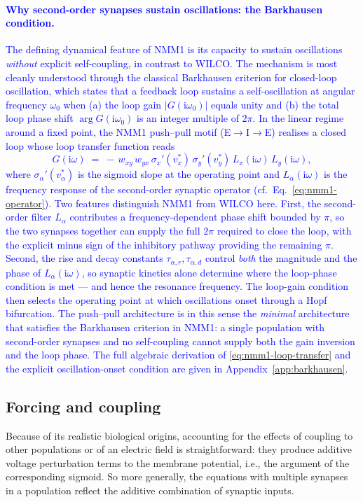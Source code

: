 \documentclass[12pt]{article}
\numberwithin{equation}{section}
\newcommand{\rev}[1]{\textcolor{blue}{#1}}
\begin{document}
\rev{\paragraph{Why second-order synapses sustain oscillations: the Barkhausen condition.}
The defining dynamical feature of NMM1 is its capacity to sustain oscillations \emph{without} explicit self-coupling, in contrast to WILCO. The mechanism is most cleanly understood through the classical Barkhausen criterion for closed-loop oscillation, which states that a feedback loop sustains a self-oscillation at angular frequency $\omega_0$ when (a) the loop gain $|G(\mathrm{i}\omega_0)|$ equals unity and (b) the total loop phase shift $\arg G(\mathrm{i}\omega_0)$ is an integer multiple of $2\pi$. In the linear regime around a fixed point, the NMM1 push--pull motif (E$\to$I$\to$E) realises a closed loop whose loop transfer function reads
\begin{equation}
G(\mathrm{i}\omega) \;=\; -\,w_{xy}\,w_{yx}\,\sigma_x'(v_x^*)\,\sigma_y'(v_y^*)\, L_x(\mathrm{i}\omega)\,L_y(\mathrm{i}\omega),
\label{eq:nmm1-loop-transfer}
\end{equation}
where $\sigma_\alpha'(v_\alpha^*)$ is the sigmoid slope at the operating point and $L_\alpha(\mathrm{i}\omega)$ is the frequency response of the second-order synaptic operator (cf.\ Eq.~\eqref{eq:nmm1-operator}). Two features distinguish NMM1 from WILCO here. First, the second-order filter $L_\alpha$ contributes a frequency-dependent phase shift bounded by $\pi$, so the two synapses together can supply the full $2\pi$ required to close the loop, with the explicit minus sign of the inhibitory pathway providing the remaining $\pi$. Second, the rise and decay constants $\tau_{\alpha,r}, \tau_{\alpha,d}$ control \emph{both} the magnitude and the phase of $L_\alpha(\mathrm{i}\omega)$, so synaptic kinetics alone determine where the loop-phase condition is met --- and hence the resonance frequency. The loop-gain condition then selects the operating point at which oscillations onset through a Hopf bifurcation. The push--pull architecture is in this sense the \emph{minimal} architecture that satisfies the Barkhausen criterion in NMM1: a single population with second-order synapses and no self-coupling cannot supply both the gain inversion and the loop phase. The full algebraic derivation of \eqref{eq:nmm1-loop-transfer} and the explicit oscillation-onset condition are given in Appendix~\ref{app:barkhausen}.}

\subsection{Forcing and coupling}
Because of its realistic biological origins, accounting for the effects of coupling to other populations or of an electric field is straightforward: they produce additive voltage perturbation terms to the membrane potential, i.e., the argument of the corresponding sigmoid. So more generally, the equations with multiple synapses in a population reflect the additive combination of synaptic inputs. 
\end{document}
